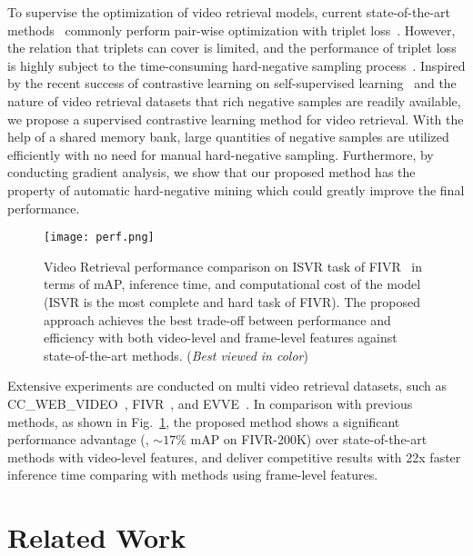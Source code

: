 \documentclass[10pt,twocolumn,letterpaper]{article}
\begin{document}
To supervise the optimization of video retrieval models, current state-of-the-art methods~\cite{kordopatis2017dml,kordopatis2019visil} commonly perform pair-wise optimization with triplet loss~\cite{weinberger2009distance}. However, the relation that triplets can cover is limited, and the performance of triplet loss is highly subject to the time-consuming hard-negative sampling process~\cite{sohn2016improved}.
Inspired by the recent success of contrastive learning on self-supervised learning~\cite{he2019momentum,chen2020simple} and the nature of video retrieval datasets that rich negative samples are readily available, we propose a supervised contrastive learning method for video retrieval. With the help of a shared memory bank, large quantities of negative samples are utilized efficiently with no need for manual hard-negative sampling.
Furthermore, by conducting gradient analysis, we show that our proposed method has the property of automatic hard-negative mining which could greatly improve the final performance.

\begin{figure}[t]
    \centering
    \texttt{[image: perf.png]}
    \caption{Video Retrieval performance comparison on ISVR task of FIVR~\cite{kordopatis2019fivr} in terms of mAP, inference time, and computational cost of the model (ISVR is the most complete and hard task of FIVR). The proposed approach achieves the best trade-off between performance and efficiency with both video-level and frame-level features against state-of-the-art methods. (\textit{Best viewed in color})}
    \label{fig:perf}
\end{figure}

Extensive experiments are conducted on multi video retrieval datasets, such as CC\_WEB\_VIDEO~\cite{wu2007practical}, FIVR~\cite{kordopatis2019fivr}, and EVVE~\cite{revaud2013event}.
In comparison with previous methods, as shown in Fig.~\ref{fig:perf}, the proposed method shows a significant performance advantage (\eg, $\sim17\%$ mAP on FIVR-200K) over state-of-the-art methods with video-level features, and deliver competitive results with 22x faster inference time comparing with methods using frame-level features.

\section{Related Work}
\end{document}

